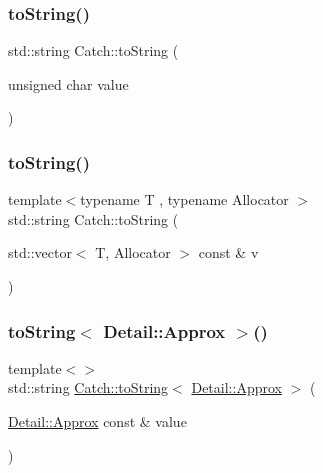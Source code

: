 \subsubsection{\texorpdfstring{to\+String()}{toString()}\hspace{0.1cm}{\footnotesize\ttfamily [16/17]}}
{\footnotesize\ttfamily std\+::string Catch\+::to\+String (\begin{DoxyParamCaption}\item[{unsigned char}]{value }\end{DoxyParamCaption})}

\mbox{\label{namespace_catch_a2899237fef39daaae9a22e7846c0a9bf}} 
\subsubsection{\texorpdfstring{to\+String()}{toString()}\hspace{0.1cm}{\footnotesize\ttfamily [17/17]}}
{\footnotesize\ttfamily template$<$typename T , typename Allocator $>$ \\
std\+::string Catch\+::to\+String (\begin{DoxyParamCaption}\item[{std\+::vector$<$ T, Allocator $>$ const \&}]{v }\end{DoxyParamCaption})}

\mbox{\label{namespace_catch_ac501c2b6bfe82978d699ddda37c53d13}} 
\subsubsection{\texorpdfstring{to\+String$<$ Detail\+::\+Approx $>$()}{toString< Detail::Approx >()}}
{\footnotesize\ttfamily template$<$$>$ \\
std\+::string \mbox{\hyperlink{namespace_catch_adbd1730f961da94d9ed284f70fd7a28b}{Catch\+::to\+String}}$<$ \mbox{\hyperlink{class_catch_1_1_detail_1_1_approx}{Detail\+::\+Approx}} $>$ (\begin{DoxyParamCaption}\item[{\mbox{\hyperlink{class_catch_1_1_detail_1_1_approx}{Detail\+::\+Approx}} const \&}]{value }\end{DoxyParamCaption})\hspace{0.3cm}{\ttfamily [inline]}}

